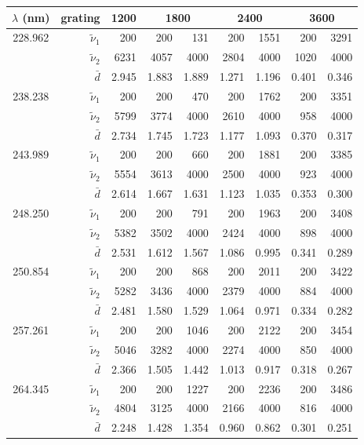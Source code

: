 \begin{tabular}{crrrrrrrr}
\toprule
$\lambda$ (nm)
	& grating & 1200 & \multicolumn{2}{c}{1800}
		& \multicolumn{2}{c}{2400} & \multicolumn{2}{c}{3600} \\
\midrule
\multirow{3}{*}{228.962}
	& $\tilde{\nu}_1$ &   200 &   200 &   131 &   200 &  1551 &   200 &  3291 \\
	& $\tilde{\nu}_2$ &  6231 &  4057 &  4000 &  2804 &  4000 &  1020 &  4000 \\
	& $\bar{d}$       & 2.945 & 1.883 & 1.889 & 1.271 & 1.196 & 0.401 & 0.346 \\
\midrule
\multirow{3}{*}{238.238}
	& $\tilde{\nu}_1$ &   200 &   200 &   470 &   200 &  1762 &   200 &  3351 \\
	& $\tilde{\nu}_2$ &  5799 &  3774 &  4000 &  2610 &  4000 &   958 &  4000 \\
	& $\bar{d}$       & 2.734 & 1.745 & 1.723 & 1.177 & 1.093 & 0.370 & 0.317 \\
\midrule
\multirow{3}{*}{243.989}
	& $\tilde{\nu}_1$ &   200 &   200 &   660 &   200 &  1881 &   200 &  3385 \\
	& $\tilde{\nu}_2$ &  5554 &  3613 &  4000 &  2500 &  4000 &   923 &  4000 \\
	& $\bar{d}$       & 2.614 & 1.667 & 1.631 & 1.123 & 1.035 & 0.353 & 0.300 \\
\midrule
\multirow{3}{*}{248.250}
	& $\tilde{\nu}_1$ &   200 &   200 &   791 &   200 &  1963 &   200 &  3408 \\
	& $\tilde{\nu}_2$ &  5382 &  3502 &  4000 &  2424 &  4000 &   898 &  4000 \\
	& $\bar{d}$       & 2.531 & 1.612 & 1.567 & 1.086 & 0.995 & 0.341 & 0.289 \\
\midrule
\multirow{3}{*}{250.854}
	& $\tilde{\nu}_1$ &   200 &   200 &   868 &   200 &  2011 &   200 &  3422 \\
	& $\tilde{\nu}_2$ &  5282 &  3436 &  4000 &  2379 &  4000 &   884 &  4000 \\
	& $\bar{d}$       & 2.481 & 1.580 & 1.529 & 1.064 & 0.971 & 0.334 & 0.282 \\
\midrule
\multirow{3}{*}{257.261}
	& $\tilde{\nu}_1$ &   200 &   200 &  1046 &   200 &  2122 &   200 &  3454 \\
	& $\tilde{\nu}_2$ &  5046 &  3282 &  4000 &  2274 &  4000 &   850 &  4000 \\
	& $\bar{d}$       & 2.366 & 1.505 & 1.442 & 1.013 & 0.917 & 0.318 & 0.267 \\
\midrule
\multirow{3}{*}{264.345}
	& $\tilde{\nu}_1$ &   200 &   200 &  1227 &   200 &  2236 &   200 &  3486 \\
	& $\tilde{\nu}_2$ &  4804 &  3125 &  4000 &  2166 &  4000 &   816 &  4000 \\
	& $\bar{d}$       & 2.248 & 1.428 & 1.354 & 0.960 & 0.862 & 0.301 & 0.251 \\
\bottomrule
\end{tabular}
